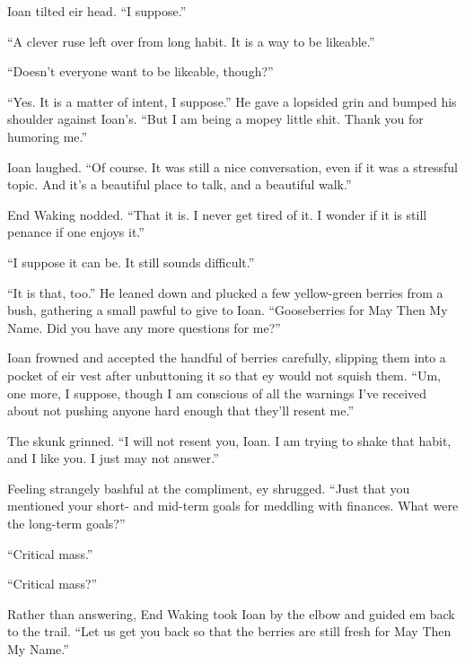 Ioan tilted eir head. ``I suppose.''

``A clever ruse left over from long habit. It is a way to be likeable.''

``Doesn't everyone want to be likeable, though?''

``Yes. It is a matter of intent, I suppose.'' He gave a lopsided grin and bumped his shoulder against Ioan's. ``But I am being a mopey little shit. Thank you for humoring me.''

Ioan laughed. ``Of course. It was still a nice conversation, even if it was a stressful topic. And it's a beautiful place to talk, and a beautiful walk.''

End Waking nodded. ``That it is. I never get tired of it. I wonder if it is still penance if one enjoys it.''

``I suppose it can be. It still sounds difficult.''

``It is that, too.'' He leaned down and plucked a few yellow-green berries from a bush, gathering a small pawful to give to Ioan. ``Gooseberries for May Then My Name. Did you have any more questions for me?''

Ioan frowned and accepted the handful of berries carefully, slipping them into a pocket of eir vest after unbuttoning it so that ey would not squish them. ``Um, one more, I suppose, though I am conscious of all the warnings I've received about not pushing anyone hard enough that they'll resent me.''

The skunk grinned. ``I will not resent you, Ioan. I am trying to shake that habit, and I like you. I just may not answer.''

Feeling strangely bashful at the compliment, ey shrugged. ``Just that you mentioned your short- and mid-term goals for meddling with finances. What were the long-term goals?''

``Critical mass.''

``Critical mass?''

Rather than answering, End Waking took Ioan by the elbow and guided em back to the trail. ``Let us get you back so that the berries are still fresh for May Then My Name.''
